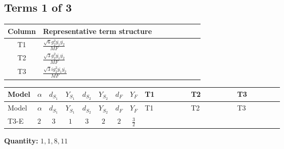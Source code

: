 \documentclass[8pt]{article}
\begin{document}
\begin{landscape}
\subsection*{Terms 1 of 3}
\begin{center}
\begin{tabular}{@{}c >{\raggedright\arraybackslash}p{0.82\linewidth}@{}}
\toprule
Column & Representative term structure \\
\midrule
T1 & \(\displaystyle \frac{\sqrt{6} g_{2}^{2} \overline{y_{1}} \overline{y_{2}}}{MF}\) \\
\midrule
T2 & \(\displaystyle \frac{\sqrt{3} g_{2}^{2} \overline{y_{1}} \overline{y_{2}}}{MF}\) \\
\midrule
T3 & \(\displaystyle \frac{\sqrt{3} i g_{2}^{2} \overline{y_{1}} \overline{y_{2}}}{MF}\) \\
\midrule
\bottomrule
\end{tabular}
\end{center}
\smallskip
\tiny
\begin{longtable}{@{}llcccccc >{\raggedright\arraybackslash}p{0.21\linewidth} >{\raggedright\arraybackslash}p{0.21\linewidth} >{\raggedright\arraybackslash}p{0.21\linewidth}@{}}
\toprule
Model & $\alpha$ & $d_{S_1}$ & $Y_{S_1}$ & $d_{S_2}$ & $Y_{S_2}$ & $d_F$ & $Y_F$ & T1 & T2 & T3 \\
\midrule
\endfirsthead
\toprule
Model & $\alpha$ & $d_{S_1}$ & $Y_{S_1}$ & $d_{S_2}$ & $Y_{S_2}$ & $d_F$ & $Y_F$ & T1 & T2 & T3 \\
\midrule
\endhead
T3-E & $2$ & $3$ & $1$ & $3$ & $2$ & $2$ & $\frac{3}{2}$ & \scriptsize\adjustbox{max width=\linewidth}{$\begin{gathered} \frac{\sqrt{6} g_{2}^{2} \overline{y_{1}} \overline{y_{2}}}{3 MF}\end{gathered}$} & \scriptsize\adjustbox{max width=\linewidth}{$\begin{gathered} \frac{\sqrt{3} g_{2}^{2} \overline{y_{1}} \overline{y_{2}}}{6 MF}\end{gathered}$} & \scriptsize\adjustbox{max width=\linewidth}{$\begin{gathered} - \frac{49 \sqrt{3} i g_{2}^{2} \overline{y_{1}} \overline{y_{2}}}{24 MF}\end{gathered}$} \\
\midrule
\bottomrule
\end{longtable}
\clearpage
\noindent\textbf{Quantity: }$\mathrm{1,1,8,11}$\par\smallskip

\end{landscape}
\end{document}
